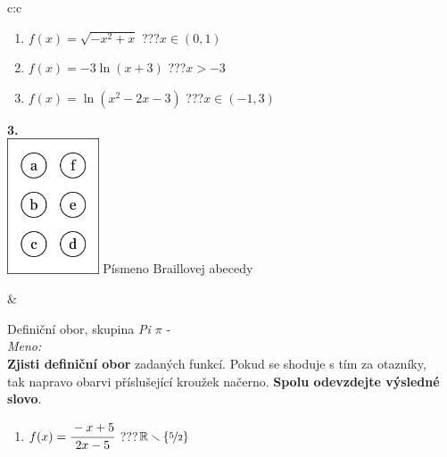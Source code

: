 \documentclass[10pt]{report}
\begin{document}
\begin{tabular}{c:c}
\begin{minipage}[c][99mm][t]{0.49\linewidth}
\begin{center}
\begin{minipage}{0.77\linewidth}
\begin{center}
\begin{varwidth}{\textwidth}
\begin{enumerate}
\item $f(x)=\sqrt{-x^2+x}$\quad \dotfill\; ???\;\dotfill \quad $x\in(0 , 1)$
\item $f(x)=-3\ln{(x+3)}$\quad \dotfill\; ???\;\dotfill \quad $x>-3$
\item $f(x)=\ln{(x^2-2x-3)}$\quad \dotfill\; ???\;\dotfill \quad $x\in(-1 , 3)$
\end{enumerate}
\end{varwidth}
\end{center}
\end{minipage}
\begin{minipage}{0.20\linewidth}
\begin{center}
{\Huge\bfseries 3.} \\[2mm]
\includegraphics[height=40mm]{../images/braille.png}
{\small Písmeno Braillovej abecedy}
\end{center}
\end{minipage}
\end{center}
\end{minipage}
&
\begin{minipage}[c][99mm][t]{0.49\linewidth}
\begin{center}
\vspace{7mm}
{\huge Definiční obor, skupina \textit{Pi $\pi$} -}\\[4.5mm]
\textit{Meno:}\phantom{xxxxxxxxxxxxxxxxxxxxxxxxxxxxxxxxxxxxxxxxxxxxxxxxxxxxxxxxxxxxxxxxx}\\[3.5mm]
\textbf{Zjisti definiční obor} zadaných funkcí. Pokud se shoduje s tím za otazníky,\\tak napravo obarvi příslušející kroužek načerno. \textbf{Spolu odevzdejte výsledné slovo}.\\[3mm]
\begin{minipage}{0.77\linewidth}
\begin{center}
\begin{varwidth}{\textwidth}
\begin{enumerate}
\normalsize
\item $f(x)=\cfrac{-x+5}{2x-5}$\quad \dotfill\; ???\;\dotfill \quad $\mathbb{R}\smallsetminus\{\nicefrac{5}{2}\}$

\end{enumerate}
\end{varwidth}
\end{center}
\end{minipage}
\end{center}
\end{minipage}
\end{tabular}
\end{document}
